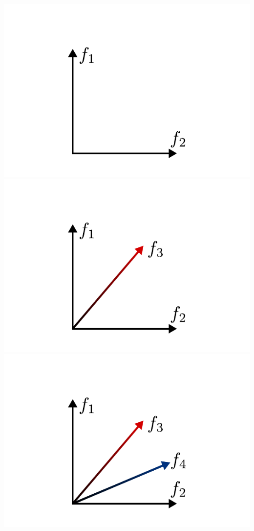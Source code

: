 \documentclass[compress]{beamer}
\begin{document}
\begin{frame}
  \begin{center}
    \begin{overprint}
      \includegraphics[scale=1.0]{../img/recursionformula/01.pdf}
      \includegraphics[scale=1.0]{../img/recursionformula/02.pdf}
      \includegraphics[scale=1.0]{../img/recursionformula/03.pdf}

\end{overprint}
\end{center}
\end{frame}
\end{document}
